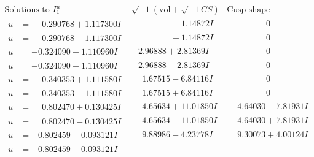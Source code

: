 \documentclass[1p]{elsarticle_modified}
\theoremstyle{definition}
\newcommand{\I}{\sqrt{-1}}
\begin{document}
$$\begin{array}{c|c|c}  
\text{Solutions to }I^u_{1}& \I (\text{vol} + \sqrt{-1}CS) & \text{Cusp shape}\\
 \hline 
\begin{aligned}
u &= \phantom{-}0.290768 + 1.117300 I\end{aligned}
 & \phantom{-0.000000 -}1.14872 I & \phantom{-0.000000 } 0 \\ \hline\begin{aligned}
u &= \phantom{-}0.290768 - 1.117300 I\end{aligned}
 & \phantom{-0.000000 } -1.14872 I & \phantom{-0.000000 } 0 \\ \hline\begin{aligned}
u &= -0.324090 + 1.110960 I\end{aligned}
 & -2.96888 + 2.81369 I & \phantom{-0.000000 } 0 \\ \hline\begin{aligned}
u &= -0.324090 - 1.110960 I\end{aligned}
 & -2.96888 - 2.81369 I & \phantom{-0.000000 } 0 \\ \hline\begin{aligned}
u &= \phantom{-}0.340353 + 1.111580 I\end{aligned}
 & \phantom{-}1.67515 - 6.84116 I & \phantom{-0.000000 } 0 \\ \hline\begin{aligned}
u &= \phantom{-}0.340353 - 1.111580 I\end{aligned}
 & \phantom{-}1.67515 + 6.84116 I & \phantom{-0.000000 } 0 \\ \hline\begin{aligned}
u &= \phantom{-}0.802470 + 0.130425 I\end{aligned}
 & \phantom{-}4.65634 + 11.01850 I & \phantom{-}4.64030 - 7.81931 I \\ \hline\begin{aligned}
u &= \phantom{-}0.802470 - 0.130425 I\end{aligned}
 & \phantom{-}4.65634 - 11.01850 I & \phantom{-}4.64030 + 7.81931 I \\ \hline\begin{aligned}
u &= -0.802459 + 0.093121 I\end{aligned}
 & \phantom{-}9.88986 - 4.23778 I & \phantom{-}9.30073 + 4.00124 I \\ \hline\begin{aligned}
u &= -0.802459 - 0.093121 I\end{aligned}

\end{array}$$
\end{document}
